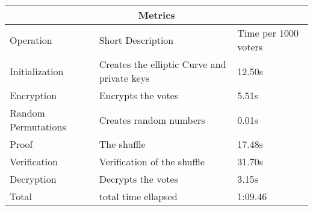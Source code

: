 \begin{tabular}{ |p{3cm}|p{5cm}|p{3cm}|  }
    \hline
    \multicolumn{3}{|c|}{Metrics}\\
    \hline
    Operation & Short Description & Time per 1000 voters\\
    \hline
    Initialization & Creates the elliptic Curve and private keys & 12.50s\\
    Encryption & Encrypts the votes & 5.51s\\
    Random Permutations & Creates random numbers & 0.01s\\
    Proof & The shuffle & 17.48s\\
    Verification & Verification of the shuffle & 31.70s\\
    Decryption & Decrypts the votes & 3.15s\\
    Total & total time ellapsed & 1:09.46\\
    \hline
\end{tabular}
